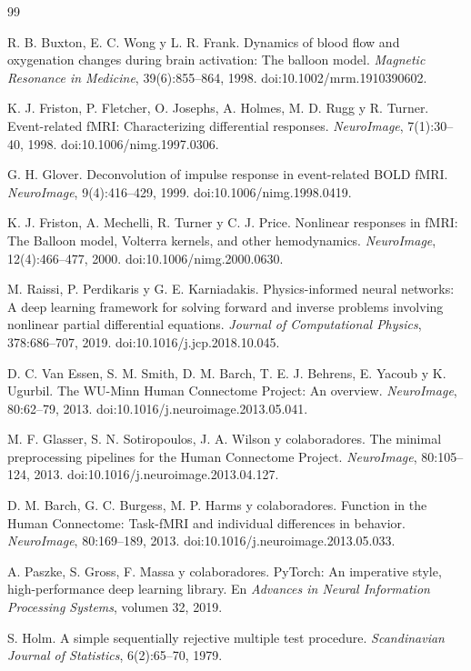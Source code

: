 \clearpage
\begin{thebibliography}{99}

R. B. Buxton, E. C. Wong y L. R. Frank.
\newblock Dynamics of blood flow and oxygenation changes during brain activation: The balloon model.
\newblock \emph{Magnetic Resonance in Medicine}, 39(6):855--864, 1998.
\newblock doi:10.1002/mrm.1910390602.

K. J. Friston, P. Fletcher, O. Josephs, A. Holmes, M. D. Rugg y R. Turner.
\newblock Event-related fMRI: Characterizing differential responses.
\newblock \emph{NeuroImage}, 7(1):30--40, 1998.
\newblock doi:10.1006/nimg.1997.0306.

G. H. Glover.
\newblock Deconvolution of impulse response in event-related BOLD fMRI.
\newblock \emph{NeuroImage}, 9(4):416--429, 1999.
\newblock doi:10.1006/nimg.1998.0419.

K. J. Friston, A. Mechelli, R. Turner y C. J. Price.
\newblock Nonlinear responses in fMRI: The Balloon model, Volterra kernels, and other hemodynamics.
\newblock \emph{NeuroImage}, 12(4):466--477, 2000.
\newblock doi:10.1006/nimg.2000.0630.

M. Raissi, P. Perdikaris y G. E. Karniadakis.
\newblock Physics-informed neural networks: A deep learning framework for solving forward and inverse problems involving nonlinear partial differential equations.
\newblock \emph{Journal of Computational Physics}, 378:686--707, 2019.
\newblock doi:10.1016/j.jcp.2018.10.045.

D. C. Van Essen, S. M. Smith, D. M. Barch, T. E. J. Behrens, E. Yacoub y K. Ugurbil.
\newblock The WU-Minn Human Connectome Project: An overview.
\newblock \emph{NeuroImage}, 80:62--79, 2013.
\newblock doi:10.1016/j.neuroimage.2013.05.041.

M. F. Glasser, S. N. Sotiropoulos, J. A. Wilson y colaboradores.
\newblock The minimal preprocessing pipelines for the Human Connectome Project.
\newblock \emph{NeuroImage}, 80:105--124, 2013.
\newblock doi:10.1016/j.neuroimage.2013.04.127.

D. M. Barch, G. C. Burgess, M. P. Harms y colaboradores.
\newblock Function in the Human Connectome: Task-fMRI and individual differences in behavior.
\newblock \emph{NeuroImage}, 80:169--189, 2013.
\newblock doi:10.1016/j.neuroimage.2013.05.033.

A. Paszke, S. Gross, F. Massa y colaboradores.
\newblock PyTorch: An imperative style, high-performance deep learning library.
\newblock En \emph{Advances in Neural Information Processing Systems}, volumen 32, 2019.

S. Holm.
\newblock A simple sequentially rejective multiple test procedure.
\newblock \emph{Scandinavian Journal of Statistics}, 6(2):65--70, 1979.

\end{thebibliography}
